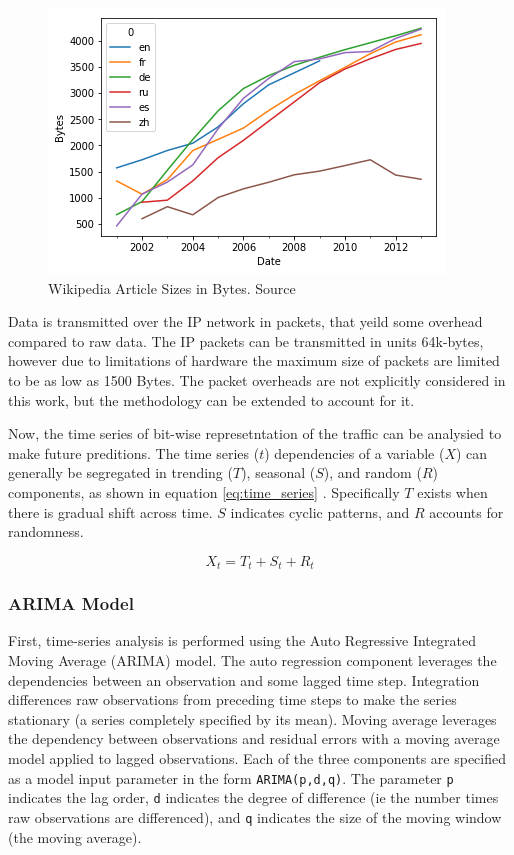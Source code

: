 \documentclass[conference]{IEEEtran}
\begin{document}
\begin{figure}[htbp]
\centering
\includegraphics[scale=.4]{art_size.png}
\caption{Wikipedia Article Sizes in Bytes. Source \cite{wiki_stats}}
\label{art_size}
\end{figure}

Data is transmitted over the IP network in packets, that yeild some overhead compared to raw data. The IP packets can be transmitted in units 64k-bytes, however due to limitations of hardware the maximum size of packets are limited to be as low as 1500 Bytes\cite{Tanenbaum}. The packet overheads are not explicitly considered in this work, but the methodology can be extended to account for it.

Now, the time series of bit-wise represetntation of the traffic can be analysied to make future preditions. The time series ($t$) dependencies of a variable ($X$) can generally be segregated in trending ($T$), seasonal ($S$), and random ($R$) components, as shown in equation \ref{eq:time_series} \cite{Zhuang}. Specifically $T$ exists when there is gradual shift across time. $S$ indicates cyclic patterns, and $R$ accounts for randomness.   

\begin{equation}
X_t = T_t + S_t + R_t\label{eq:time_series}
\end{equation}

\subsubsection*{ARIMA Model}
First, time-series analysis is performed using the Auto Regressive Integrated Moving Average (ARIMA) model. The auto regression component leverages the dependencies between an observation and some lagged time step. Integration differences raw observations from preceding time steps to make the series stationary (a series completely specified by its mean). Moving average leverages the dependency between observations and residual errors with a moving average model applied to lagged observations. Each of the three components are specified as a model input parameter in the form \texttt{ARIMA(p,d,q)}. The parameter \texttt{p} indicates the lag order, \texttt{d} indicates the degree of difference (ie the number times raw observations are differenced), and \texttt{q} indicates the size of the moving window (the moving average).
\end{document}
